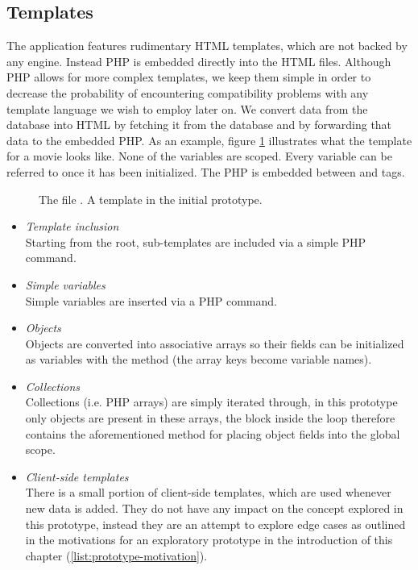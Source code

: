 \documentclass[thesis.tex]{subfiles}
\begin{document}
\subsection{Templates}
The application features rudimentary HTML templates, which are not backed by
any engine. Instead PHP is embedded directly into the HTML files.
Although PHP allows for more complex templates, we keep them simple in order to
decrease the probability of encountering compatibility problems with any
template language we wish to employ later on.
We convert data from the database into HTML by fetching it from the database and
by forwarding that data to the embedded PHP.
As an example, figure \ref{fig:movie.view.tpl} illustrates what the template
for a movie looks like.
None of the variables are scoped. Every variable can be referred to once it has
been initialized.
The PHP is embedded between  and  tags.

\begin{figure}
	\centering
	
	\caption{The file . A template in the initial prototype.}
	\label{fig:movie.view.tpl}
\end{figure}

\begin{itemize}
	\item \emph{Template inclusion}\\
	Starting from the root, sub-templates are included via a simple
	PHP  command.
	\item \emph{Simple variables}\\
	Simple variables are inserted via a PHP  command.
	\item \emph{Objects}\\
	Objects are converted into associative arrays so their fields can be
	initialized as variables with the  method
	(the array keys become variable names).
	\item \emph{Collections}\\
	Collections (i.e. PHP arrays) are simply iterated through, in this prototype
	only objects are present in these arrays, the block inside the
	 loop therefore contains the aforementioned method
	for placing object fields into the global scope.
	\item \emph{Client-side templates}\\
	There is a small portion of client-side templates, which are used whenever new
	data is added.  They do not have any impact on the concept explored in
	this prototype, instead they are an attempt to explore edge cases as outlined
	in the motivations for an exploratory prototype in the introduction of this
	chapter (\ref{list:prototype-motivation}).
\end{itemize}
\end{document}
